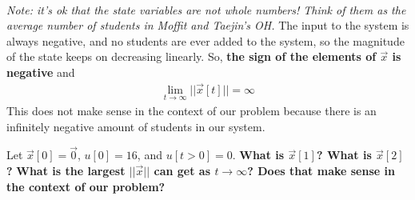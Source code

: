 \begin{enumerate}
{\begin{align*}
        \end{align*}
        \textit{Note: it's ok that the state variables are not whole numbers! Think of them as the average number of students in Moffit and Taejin's OH.}
        \newline
        The input to the system is always negative, and no students are ever added to the system, so the magnitude of the state keeps on decreasing linearly. So, \textbf{the sign of the elements of $\vec{x}$ is negative} and
        \begin{align*}
            \lim_{t \to \infty} ||\vec{x}[t]|| = \infty
        \end{align*}
        This does not make sense in the context of our problem because there is an infinitely negative amount of students in our system.
    }

    \qitem Let $\vec{x}[0] = \vec{0}$, $u[0] = 16$, and $u[t>0] = 0$. \textbf{What is $\vec{x}[1]$? What is $\vec{x}[2]$?} \textbf{What is the largest $||\vec{x}||$ can get as $t\rightarrow\infty$? Does that make sense in the context of our problem?}

\end{enumerate}
